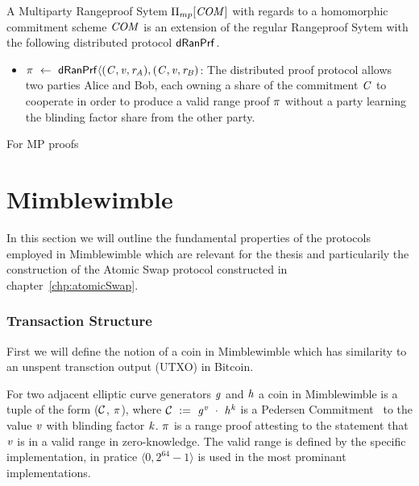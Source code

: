\begin{definition}
    A Multiparty Rangeproof Sytem $\Pi_{mp}[\mathit{COM}]$ with regards to a homomorphic commitment scheme $\mathit{COM}$ is an extension of the regular Rangeproof Sytem with the following
    distributed protocol $\mathsf{dRanPrf}$.
    \begin{itemize}
        \item $\pi ~\leftarrow~ \mathsf{dRanPrf} \langle(\mathit{C},\mathit{v},\mathit{r}_{\mathit{A}}),(\mathit{C},\mathit{v},\mathit{r}_{\mathit{B}})$: The distributed proof protocol allows two parties Alice and Bob, each owning a share of the
        commitment $\mathit{C}$ to cooperate in order to produce a valid range proof $\pi$ without a party learning the blinding factor share from the other party.
    \end{itemize}
\end{definition}

For MP proofs \cite{klinec2020privacy}

\section{Mimblewimble} \label{sec:pre:mimblewimble}
In this section we will outline the fundamental properties of the protocols employed in Mimblewimble which are relevant for the thesis and particularily the construction of the Atomic Swap protocol constructed in chapter~\ref{chp:atomicSwap}.
\subsubsection{Transaction Structure} \label{subsec:pre:mimblwimble-tx}

First we will define the notion of a coin in Mimblewimble which has similarity to an unspent transction output (UTXO) in Bitcoin.
\begin{definition}
    For two adjacent elliptic curve generators $\mathit{g}$ and $\mathit{h}$ a coin in Mimblewimble is a tuple of the form ($\mathcal{C}$, $\pi$), where $\mathcal{C} ~:=~ \mathit{g}^{\mathit{v}} ~\cdot~ \mathit{h}^{\mathit{k}}$ is a Pedersen Commitment~\cite{pedersen1991non}
    to the value $\mathit{v}$ with blinding factor $\mathit{k}$. $\pi$ is a range proof attesting to the statement that $\mathit{v}$ is in a valid range in zero-knowledge.
    The valid range is defined by the specific implementation, in pratice $\langle 0, 2^{64} -1 \rangle$ is used in the most prominant implementations.
\end{definition}

